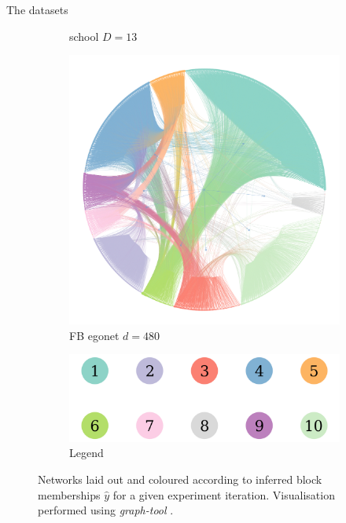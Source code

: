 \documentclass{beamer}
\begin{document}
\begin{frame}{The datasets}
\begin{figure}[!h]
\begin{subfigure}[t]{0.3\linewidth}
				\caption{school $D=13$}
				\label{fig:school-graph}
			\end{subfigure}
			\hfill
			\begin{subfigure}[t]{0.3\linewidth}
				\centering
				\includegraphics[width=\linewidth]{fb-graph.png}
				\caption{FB egonet $d=480$}
				\label{fig:fb-graph}
			\end{subfigure}
			\begin{subfigure}[t]{0.4\linewidth}
				\centering
				\includegraphics[width=0.8\linewidth]{10-horizontal-legend.png}
				\caption{Legend}
				\label{fig:10-legend}
			\end{subfigure}
			\caption{Networks laid out and coloured according to inferred block memberships $\hat{y}$ for a given experiment iteration. Visualisation performed using \textit{graph-tool} \cite{peixoto_graph-tool_2014}.}
			\label{fig:graphs-all}
		\end{figure}
	\end{frame}
	
\end{document}
